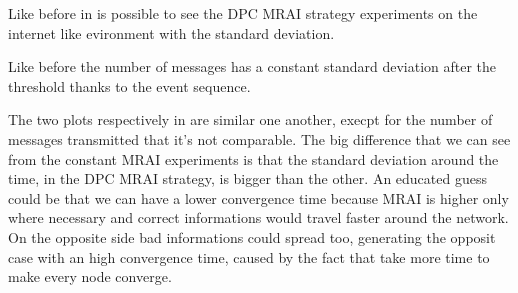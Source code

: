 \documentclass[10pt,conference,letterpaper]{IEEEtran}
\begin{document}
Like before in  is possible to see the
\ac{DPC} \ac{MRAI} strategy experiments on the internet like evironment with
the standard deviation.

Like before the number of messages has a constant standard deviation after the
threshold thanks to the event sequence.

The two plots respectively in 
are similar one another, execpt for the number of messages transmitted that it's
not comparable.
The big difference that we can see from the constant \ac{MRAI} experiments is that
the standard deviation around the time, in the \ac{DPC} \ac{MRAI} strategy, is 
bigger than the other. An educated guess could be that we can have a lower 
convergence time because \ac{MRAI} is higher only where necessary and correct 
informations would travel faster around the network. On the opposite side 
bad informations could spread too, generating the opposit case with an high
convergence time, caused by the fact that take more time to make every node 
converge.
\end{document}
